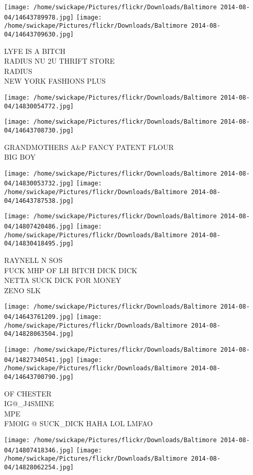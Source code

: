 \documentclass[10pt,letterpaper]{article}
\begin{document}
\texttt{[image: /home/swickape/Pictures/flickr/Downloads/Baltimore 2014-08-04/14643789978.jpg]}
\texttt{[image: /home/swickape/Pictures/flickr/Downloads/Baltimore 2014-08-04/14643709630.jpg]}

LYFE IS A BITCH\\
RADIUS NU 2U THRIFT STORE\\
RADIUS\\
NEW YORK FASHIONS PLUS
\pagebreak

\texttt{[image: /home/swickape/Pictures/flickr/Downloads/Baltimore 2014-08-04/14830054772.jpg]}

\vspace{0.25in}
\texttt{[image: /home/swickape/Pictures/flickr/Downloads/Baltimore 2014-08-04/14643708730.jpg]}

GRANDMOTHERS A\&P FANCY PATENT FLOUR\\
BIG BOY
\pagebreak

\texttt{[image: /home/swickape/Pictures/flickr/Downloads/Baltimore 2014-08-04/14830053732.jpg]}
\texttt{[image: /home/swickape/Pictures/flickr/Downloads/Baltimore 2014-08-04/14643787538.jpg]}

\texttt{[image: /home/swickape/Pictures/flickr/Downloads/Baltimore 2014-08-04/14807420486.jpg]}
\texttt{[image: /home/swickape/Pictures/flickr/Downloads/Baltimore 2014-08-04/14830418495.jpg]}

RAYNELL N SOS\\
FUCK MHP OF LH BITCH DICK DICK\\
NETTA SUCK DICK FOR MONEY\\
ZENO SLK
\pagebreak

\texttt{[image: /home/swickape/Pictures/flickr/Downloads/Baltimore 2014-08-04/14643761209.jpg]}
\texttt{[image: /home/swickape/Pictures/flickr/Downloads/Baltimore 2014-08-04/14828063504.jpg]}

\texttt{[image: /home/swickape/Pictures/flickr/Downloads/Baltimore 2014-08-04/14827340541.jpg]}
\texttt{[image: /home/swickape/Pictures/flickr/Downloads/Baltimore 2014-08-04/14643700790.jpg]}

OF CHESTER\\
IG@\_J4SMINE\\
MPE\\
FMOIG @ SUCK\_DICK HAHA LOL LMFAO
\pagebreak

\texttt{[image: /home/swickape/Pictures/flickr/Downloads/Baltimore 2014-08-04/14807418346.jpg]}
\texttt{[image: /home/swickape/Pictures/flickr/Downloads/Baltimore 2014-08-04/14828062254.jpg]}
\end{document}
